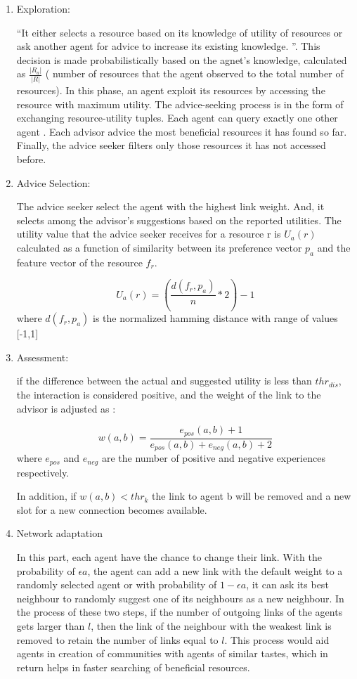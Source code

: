 \documentclass [12pt]{article} \usepackage{multicol}
\begin{document}
\begin{enumerate}
\item Exploration:

``It either selects a resource based on its knowledge of utility of resources or 
ask another agent for advice to increase its existing knowledge. ''. This decision is made probabilistically
based on the agnet's knowledge, calculated as $\frac{|R_a|}{|R|}$ ( number of resources that the agent observed to the total number of 
resources). 
In this phase, an agent exploit its resources by accessing the resource with maximum utility. 
\newline The advice-seeking process is in the form of exchanging resource-utility tuples.
\newline Each agent can query exactly one other agent .
\newline Each advisor advice the most beneficial resources it has found so far.
\newline Finally, the advice seeker filters only those resources it has not accessed before. 

\item Advice Selection:

The advice seeker select the agent with the highest link weight. And, it selects among the advisor's suggestions based on the reported utilities.
The utility value that the advice seeker receives for a resource r is $ U_a(r)$ calculated as a function
of similarity between its preference vector $p_a$ and the feature vector of the resource $f_r$.

$$ U_a(r) = (\frac{d(f_r,p_a)}{n} * 2) -1  $$ 
where $d(f_r,p_a)$ is the normalized hamming distance with range of values [-1,1]

\item Assessment:

if the difference between the actual and suggested utility is less than $thr_{dis}$, the interaction is 
considered positive, and the weight of the link to the advisor is adjusted as :

$$ w(a,b) = \frac{e_{pos}(a,b) +1}{e_{pos}(a,b) + e_{neg}(a,b)+2}$$ 
where $e_{pos}$ and $e_{neg}$ are the number of positive and negative experiences respectively. 

In addition, if  $ w(a,b) < {thr}_k $  the link to agent b will be removed and a new slot for a new connection becomes available. 

\item Network adaptation  

In this part, each agent have the chance to change their link. With the probability of $\epsilon a$,
the agent can add a new link with the default weight to a randomly selected agent or with probability of $
1 - \epsilon a$, it can ask its best neighbour to randomly suggest one of its neighbours as a new neighbour. 
In the process of these two steps, if the number of outgoing links of the agents gets larger than $l$,
then the link of the neighbour with the weakest link is removed to retain the number of links equal to $l$. This process would aid agents in creation of 
communities with agents of similar tastes, which in return helps in faster searching of beneficial resources. 
 

\end{enumerate}
\end{document}

